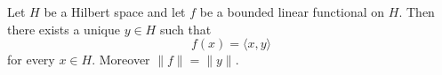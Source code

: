 Let $H$ be a Hilbert space and let $f$ be a bounded linear functional on $H$. Then there exists a unique $y \in H$ such that
$$f(x) = \langle x, y \rangle$$
for every $x \in H$. Moreover $\|f\| = \|y\|$.
